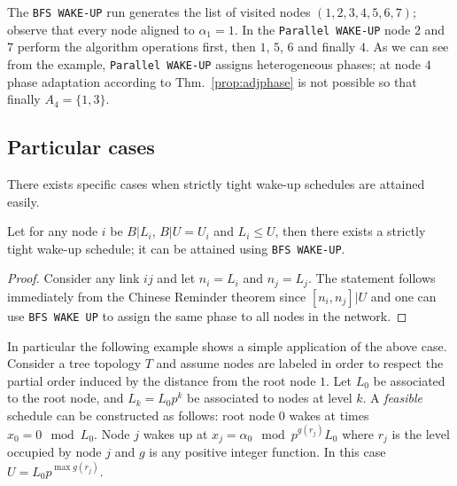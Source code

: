 The {\tt BFS WAKE-UP} run generates the list of visited 
nodes $(1,2,3,4,5,6,7)$; observe that every node aligned to 
$\alpha_1=1$. In the {\tt Parallel WAKE-UP} node $2$ and $7$ perform 
 the algorithm operations first, then $1$, $5$, $6$ and finally $4$. 
As we can see from the example, {\tt Parallel WAKE-UP} assigns 
heterogeneous phases; at node $4$ phase adaptation according 
to Thm.~\ref{prop:adjphase} is not possible so that finally 
$A_4=\{1,3\}$.


\subsection{Particular cases}\label{sec:particular}


There exists specific cases when strictly tight wake-up schedules are attained easily.
\begin{lem}
Let for any node $i$ be $B|L_i$, $B|U=U_i$ and $L_i\leq U$, then there exists a strictly tight wake-up schedule; it can be attained
using {\tt BFS WAKE-UP}. 
\end{lem} 
\begin{proof}
Consider any link $ij$ and let $n_i=L_i$ and $n_j=L_j$. The statement follows immediately 
from the Chinese Reminder theorem since $[n_i,n_j]|U$ and one can use 
{\tt BFS WAKE UP} to assign the same phase to all nodes in the network. 
\end{proof}

In particular the following example shows a simple application of the above
case. Consider a tree topology $T$ and assume nodes are labeled in order to respect the partial order induced 
by the distance from the root node $1$. Let $L_0$ be associated to the root node, and $L_k=L_0p^k$ be associated 
to nodes at level $k$. A {\em feasible} schedule can be constructed as follows: root node $0$ wakes at times $x_0=0 \mod L_0$.
Node $j$ wakes up at $x_j=\alpha_0 \mod p^{g(r_j)} L_0 $ where $r_j$ is the level occupied by node $j$ and $g$ is any positive integer 
function. In this case $U=L_0p^{\max g(r_j)}$.



